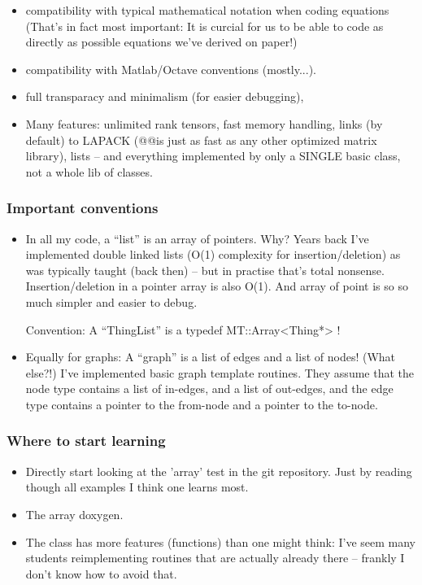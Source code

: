 \begin{itemize}
\item compatibility with typical mathematical notation when coding
equations (That's in fact most important: It is curcial for us to be
able to code as directly as possible equations we've derived on
paper!)

\item compatibility with Matlab/Octave conventions (mostly...).

\item full transparacy and minimalism (for easier debugging),

\item Many features: unlimited rank tensors, fast memory handling, links
(by default) to LAPACK (@@is just as fast as any other
optimized matrix library), lists -- and everything implemented by only
a SINGLE basic class, not a whole lib of classes.
\end{itemize}


\subsubsection{Important conventions}

\begin{itemize}
\item In all my code, a ``list'' is an array of pointers. Why? Years back
   I've implemented double linked lists (O(1) complexity for
   insertion/deletion) as was typically taught (back then) -- but in
   practise that's total nonsense. Insertion/deletion in a pointer
   array is also O(1). And array of point is so so much simpler and
   easier to debug.

   Convention: A ``ThingList'' is a typedef MT::Array<Thing*> !

\item Equally for graphs: A ``graph'' is a list of edges and a list of
   nodes! (What else?!) I've implemented basic graph template
   routines. They assume that the node type contains a list of
   in-edges, and a list of out-edges, and the edge type contains a
   pointer to the from-node and a pointer to the to-node.
\end{itemize}

\subsubsection{Where to start learning}

\begin{itemize}
\item Directly start looking at the 'array' test in the git
repository. Just by reading though all examples I think one learns
most.

\item The array doxygen.

\item The class has more features (functions) than one might think: I've
seem many students reimplementing routines that are actually already
there -- frankly I don't know how to avoid that.
\end{itemize}


